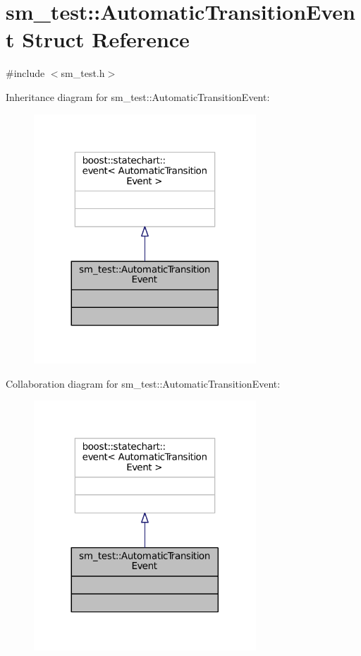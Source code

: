 \hypertarget{structsm__test_1_1AutomaticTransitionEvent}{}\section{sm\+\_\+test\+:\+:Automatic\+Transition\+Event Struct Reference}
\label{structsm__test_1_1AutomaticTransitionEvent}


{\ttfamily \#include $<$sm\+\_\+test.\+h$>$}



Inheritance diagram for sm\+\_\+test\+:\+:Automatic\+Transition\+Event\+:
\nopagebreak
\begin{figure}[H]
\begin{center}
\leavevmode
\includegraphics[width=236pt]{structsm__test_1_1AutomaticTransitionEvent__inherit__graph}
\end{center}
\end{figure}


Collaboration diagram for sm\+\_\+test\+:\+:Automatic\+Transition\+Event\+:
\nopagebreak
\begin{figure}[H]
\begin{center}
\leavevmode
\includegraphics[width=236pt]{structsm__test_1_1AutomaticTransitionEvent__coll__graph}
\end{center}
\end{figure}



